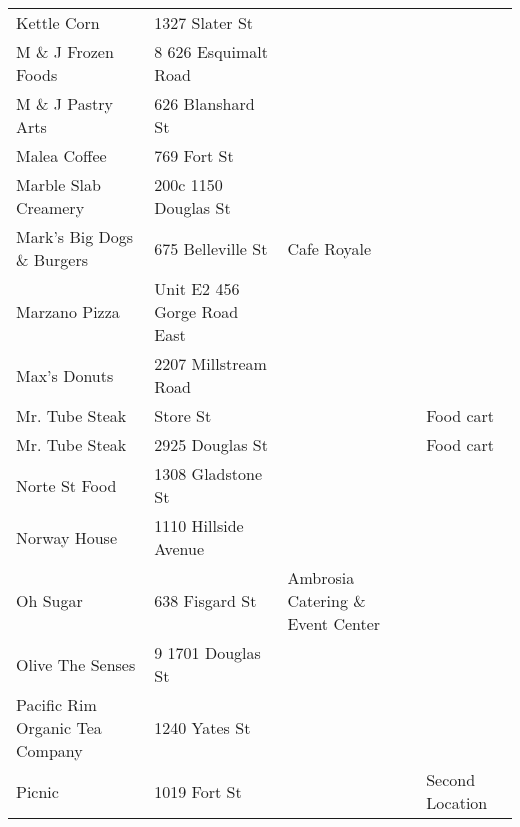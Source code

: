 \documentclass[9pt]{article}
\begin{document}
\begin{tabular}{p{5cm}|p{4cm}|p{5cm}|p{3cm}}
Kettle Corn                                & 1327 Slater St              &                                   &                 \\
M \& J Frozen Foods                        & 8 626 Esquimalt Road        &                                   &                 \\
M \& J Pastry Arts                         & 626 Blanshard St            &                                   &                 \\
Malea Coffee                               & 769 Fort St                 &                                   &                 \\
Marble Slab Creamery                       & 200c 1150 Douglas St        &                                   &                 \\
Mark's Big Dogs \& Burgers                 & 675 Belleville St           & Cafe Royale                       &                 \\
Marzano Pizza                              & Unit E2 456 Gorge Road East &                                   &                 \\
Max's Donuts                               & 2207 Millstream Road        &                                   &                 \\
Mr. Tube Steak                             & Store St                    &                                   & Food cart \\
Mr. Tube Steak                             & 2925 Douglas St             &                                   & Food cart \\
Norte St Food                              & 1308 Gladstone St           &                                   &                 \\
Norway House                               & 1110 Hillside Avenue        &                                   &                 \\
Oh Sugar                                   & 638 Fisgard St              & Ambrosia Catering \& Event Center &                 \\
Olive The Senses                           & 9 1701 Douglas St           &                                   &                 \\
Pacific Rim Organic Tea Company            & 1240 Yates St               &                                   &                 \\
Picnic                                     & 1019 Fort St                &                                   & Second Location \\

\end{tabular}
\end{document}
